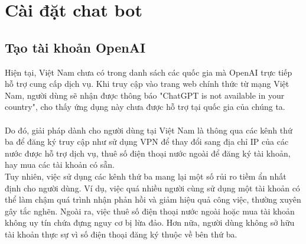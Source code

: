 \documentclass[a4paper, 12pt]{article}
\begin{document}
	\section{Cài đặt chat bot}
		\subsection{Tạo tài khoản OpenAI}
		Hiện tại, Việt Nam chưa có trong danh sách các quốc gia mà OpenAI trực  tiếp hỗ trợ cung cấp dịch vụ. Khi truy cập vào trang web chính thức từ mạng Việt Nam, người dùng sẽ nhận được thông báo "ChatGPT is not available in your country", cho thấy ứng dụng này chưa được hỗ trợ tại quốc gia của chúng ta.
		\\
		\\
		Do đó, giải pháp dành cho người dùng tại Việt Nam là thông qua các kênh thứ ba để đăng ký truy cập như sử dụng VPN để thay đổi sang địa chỉ IP của các nước được hỗ trợ dịch vụ, thuê số điện thoại nước ngoài để đăng ký tài khoản, hay mua các tài khoản có sẵn. 
		\\
		Tuy nhiên, việc sử dụng các kênh thứ ba mang lại một số rủi ro tiềm ẩn nhất định cho người dùng. Ví dụ, việc quá nhiều người cùng sử dụng một tài khoản có thể làm chậm quá trình nhận phản hồi và giảm hiệu quả công việc, thường xuyên gây tắc nghẽn. Ngoài ra, việc thuê số điện thoại nước ngoài hoặc mua tài khoản không uy tín chứa đựng nguy cơ bị lừa đảo. Hơn nữa, người dùng không sở hữu tài khoản thực sự vì số điện thoại đăng ký thuộc về bên thứ ba.
		
\end{document}
